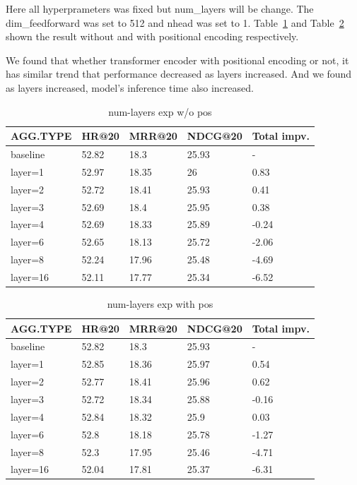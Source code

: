 \documentclass{article}
\begin{document}
Here all hyperprameters was fixed but num\_layers will be change.
The dim\_feedforward was set to 512 and nhead was set to 1.
Table~\ref{num-layers exp w/o pos} and Table~\ref{num-layers exp with pos}
shown the result without and with positional encoding respectively.

We found that whether transformer encoder with positional encoding or not,
it has similar trend that performance decreased as layers increased.
And we found as layers increased, model's inference time also increased.

\begin{table}
    \caption{num-layers exp w/o pos}
    \label{num-layers exp w/o pos}
    \centering
    \begin{tabular}{lllll}
        \toprule
        AGG.TYPE & HR@20 & MRR@20 & NDCG@20 & Total impv. \\
        \midrule
        baseline & 52.82 & 18.3   & 25.93   & -           \\
        layer=1  & 52.97 & 18.35  & 26      & 0.83        \\
        layer=2  & 52.72 & 18.41  & 25.93   & 0.41        \\
        layer=3  & 52.69 & 18.4   & 25.95   & 0.38        \\
        layer=4  & 52.69 & 18.33  & 25.89   & -0.24       \\
        layer=6  & 52.65 & 18.13  & 25.72   & -2.06       \\
        layer=8  & 52.24 & 17.96  & 25.48   & -4.69       \\
        layer=16 & 52.11 & 17.77  & 25.34   & -6.52       \\
        \bottomrule
    \end{tabular}
\end{table}

\begin{table}
    \caption{num-layers exp with pos}
    \label{num-layers exp with pos}
    \centering
    \begin{tabular}{lllll}
        \toprule
        AGG.TYPE & HR@20 & MRR@20 & NDCG@20 & Total impv. \\
        \midrule
        baseline & 52.82 & 18.3   & 25.93   & -           \\
        layer=1  & 52.85 & 18.36  & 25.97   & 0.54        \\
        layer=2  & 52.77 & 18.41  & 25.96   & 0.62        \\
        layer=3  & 52.72 & 18.34  & 25.88   & -0.16       \\
        layer=4  & 52.84 & 18.32  & 25.9    & 0.03        \\
        layer=6  & 52.8  & 18.18  & 25.78   & -1.27       \\
        layer=8  & 52.3  & 17.95  & 25.46   & -4.71       \\
        layer=16 & 52.04 & 17.81  & 25.37   & -6.31       \\
        \bottomrule
    \end{tabular}
\end{table}
\end{document}
